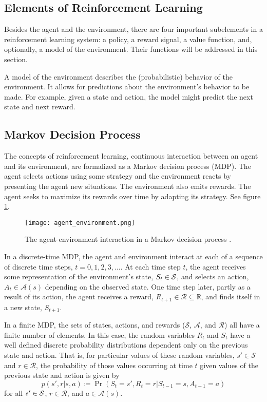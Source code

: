 \subsection{Elements of Reinforcement Learning}

Besides the agent and the environment, there are four important subelements in a reinforcement learning system: a policy, a reward signal, a value function, and, optionally, a model of the environment. Their functions will be addressed in this section.

A model of the environment describes the (probabilistic) behavior of the environment. It allows for predictions about the environment’s behavior to be made. For example, given a state and action, the model might predict the next state and next reward.

\subsection{Markov Decision Process}

The concepts of reinforcement learning, continuous interaction between an agent and its environment, are formalized as a Markov decision process (MDP). The agent selects actions using some strategy and the environment reacts by presenting the agent new situations. The environment also emits rewards. The agent seeks to maximize its rewards over time by adapting its strategy. See figure \ref{fig:agent_environment}.

\begin{figure}[H]
    \centering
    \texttt{[image: agent\_environment.png]}
    \caption{The agent-environment interaction in a Markov decision process \cite{sutton_barto_2012}.}
    \label{fig:agent_environment}
\end{figure}

In a discrete-time MDP, the agent and environment interact at each of a sequence of discrete time steps, $t = 0, 1, 2, 3, \dots$. At each time step $t$, the agent receives some representation of the environment’s state, $S_t \in \S$, and selects an action, $A_t \in \mathcal{A}(s)$ depending on the observed state. One time step later, partly as a result of its action, the agent receives a reward, $R_{t+1} \in \mathcal{R} \subseteq \mathbb{R}$, and finds itself in a new state, $S_{t+1}$. 

In a finite MDP, the sets of states, actions, and rewards ($\mathcal{S}$, $\mathcal{A}$, and $\mathcal{R}$) all have a finite number of elements. In this case, the random variables $R_t$ and $S_t$ have a well defined discrete probability distributions dependent only on the previous state and action. That is, for particular values of these random variables, $s' \in \mathcal{S}$ and $r \in \mathcal{R}$, the probability of those values occurring at time $t$ given values of the previous state and action is given by
\[
    p(s', r | s, a) \coloneqq \Pr(S_t = s' , R_t = r | S_{t-1} = s, A_{t-1} = a)
 \]
for all $s' \in \S$, $r \in \mathcal{R}$, and $a \in \mathcal{A}(s)$. 

